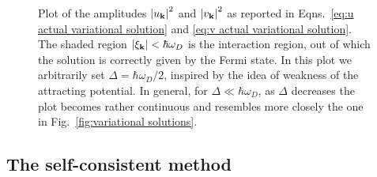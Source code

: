 \begin{figure}
	\centering
	
	\caption{Plot of the amplitudes $\abs{u_\mathbf{k}}^2$ and $\abs{v_\mathbf{k}}^2$ as reported in Eqns.~\eqref{eq:u actual variational solution} and \eqref{eq:v actual variational solution}. The shaded region $\abs{\xi_\mathbf{k}} < \hbar\omega_D$ is the interaction region, out of which the solution is correctly given by the Fermi state. In this plot we arbitrarily set $\Delta = \hbar\omega_D/2$, inspired by the idea of weakness of the attracting potential. In general, for $\Delta \ll \hbar\omega_D$, as $\Delta$ decreases the plot becomes rather continuous and resembles more closely the one in Fig.~\ref{fig:variational solutions}.}
	\label{fig:actual variational solutions}
\end{figure}

\subsection{The self-consistent method}

